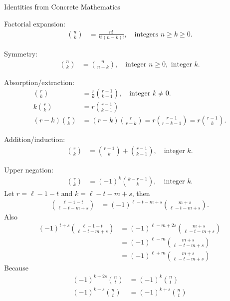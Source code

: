 Identities from Concrete Mathematics~\cite[p. 174]{graham1994concrete}
\begin{identity}
    Factorial expansion:
    \begin{align*}
        \binom{n}{k} &= \frac{n!}{k!(n-k)!}, \quad \text{integers } n \geq k \geq 0.
    \end{align*}
\end{identity}

\begin{identity}
    Symmetry:
    \begin{align*}
        \binom{n}{k} &= \binom{n}{n-k}, \quad \text{integer } n \geq 0, \text{ integer } k.
    \end{align*}
\end{identity}

\begin{identity}
    Absorption/extraction:
    \begin{align*}
        \binom{r}{k} &= \frac{r}{k} \binom{r-1}{k-1}, \quad \text{integer } k \neq 0. \\
        k \binom{r}{k} &= r \binom{r-1}{k-1} \\
        (r-k) \binom{r}{k} &= (r-k) \binom{r}{r-k} = r \binom{r-1}{r-k-1} = r \binom{r-1}{k}.
    \end{align*}
\end{identity}

\begin{identity}
    Addition/induction:
    \begin{align*}
        \binom{r}{k} &= \binom{r-1}{k} + \binom{r-1}{k-1}, \quad \text{integer } k.
    \end{align*}
\end{identity}

\begin{identity}
    Upper negation:
    \begin{align*}
        \binom{r}{k} &= (-1)^k \binom{k - r - 1}{k}, \quad \text{integer } k.
    \end{align*}
    Let $r=\ell-1-t$ and $k=\ell-t-m+s$, then
    \begin{align*}
        \binom{\ell-1-t}{\ell-t-m+s} &= (-1)^{\ell-t-m+s} \binom{m+s}{\ell-t-m+s}.
    \end{align*}
    Also
    \begin{align*}
    (-1)
        ^{t+s} \binom{\ell-1-t}{\ell-t-m+s}
        &= (-1)^{\ell-m+2s} \binom{m+s}{\ell-t-m+s} \\
        &= (-1)^{\ell-m} \binom{m+s}{\ell-t-m+s} \\
        &= (-1)^{\ell+m} \binom{m+s}{\ell-t-m+s}
    \end{align*}
    Because
    \begin{align*}
    (-1)
        ^{k+2s} \binom{n}{t} &= (-1)^k \binom{n}{t} \\
        (-1)^{k-s} \binom{n}{t}  &= (-1)^{k+s} \binom{n}{t}
    \end{align*}
\end{identity}


